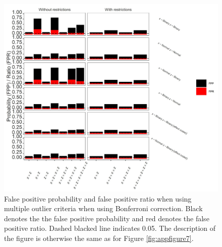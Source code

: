 \begin{figure}[hbt!]
\includegraphics[scale=0.95]{R/Analysis/Result/Figures/Figure1BSIBon.jpeg}
\centering
\caption{False positive probability and false positive ratio when using multiple outlier criteria when using Bonferroni correction. Black denotes the the false positive probability and red denotes the false positive ratio. Dashed blacked line indicates 0.05. The description of the figure is otherwise the same as for Figure \ref{fig:appfigure7}.
}
\label{fig:appfigure10}
\end{figure}



